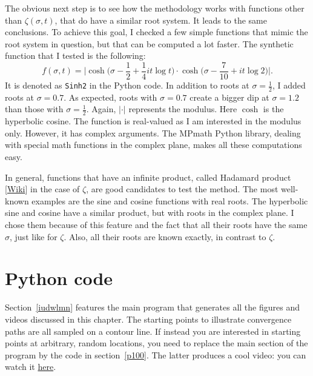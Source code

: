 \documentclass[oneside,10pt]{book}
\begin{document}
The obvious next step is to see how the methodology works with functions other than $\zeta(\sigma,t)$, that do have a similar root system.
 It leads to the same conclusions. To achieve this goal, I checked a few simple functions that mimic the root system in question,
 but that can be computed a lot faster. The synthetic function that I tested is the following:
$$
f(\sigma, t) = \Big| \cosh\Big(\sigma-\frac{1}{2} +\frac{1}{4} it\log t\Big) \cdot \cosh\Big(\sigma - \frac{7}{10} + i t\log 2\Big)\Big|.
$$
It is denoted as \texttt{Sinh2} in the Python code. In addition to roots at $\sigma=\frac{1}{2}$, I added roots at $\sigma = 0.7$. As expected, roots with $\sigma=0.7$ create a bigger dip at $\sigma=1.2$  than those with $\sigma=\frac{1}{2}$.  Again,
 $|\cdot|$ represents the modulus. Here $\cosh$  is the hyperbolic cosine. The function is real-valued as I am interested in the modulus only. However, it has complex arguments. The MPmath Python library, dealing with special math functions in the complex plane,  makes all these computations easy.

In general, functions that have an infinite product, called
\textcolor{index}{Hadamard product} [\href{https://en.wikipedia.org/wiki/Riemann_zeta_function#Hadamard_product}{Wiki}] in the case of $\zeta$, are good candidates to test the method. The most well-known examples are the sine and cosine functions with real roots. The hyperbolic sine and cosine have a similar product, but with roots in the complex plane. I chose them because of this feature and the fact that all their roots have the same $\sigma$, just like for $\zeta$. Also, all their roots are known exactly, in contrast to $\zeta$.



\section{Python code}\label{pc991}

Section~\ref{iudwlmn} features the main program that generates all the figures and videos discussed in this chapter.  The starting points to illustrate convergence paths are all sampled on a contour line. If instead you are interested in starting points at arbitrary, random locations, you
 need to replace the main section of the program by the code in section~\ref{p100}. The latter produces a cool video: you can watch it
 \href{https://www.youtube.com/watch?v=pqQsLpPkvbw}{here}.
\end{document}
